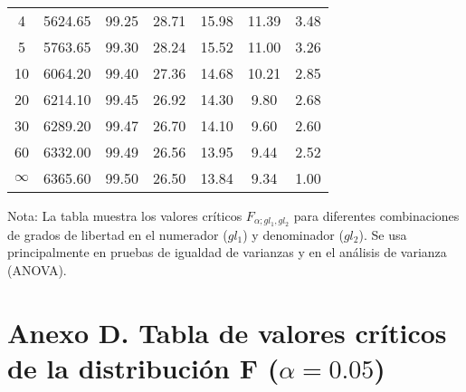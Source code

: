 {\begin{minipage}[t]{0.48\linewidth}
\begin{tabular}{c|cccccc}
4  & 5624.65 & 99.25 & 28.71 & 15.98 & 11.39 & 3.48 \\
5  & 5763.65 & 99.30 & 28.24 & 15.52 & 11.00 & 3.26 \\
10 & 6064.20 & 99.40 & 27.36 & 14.68 & 10.21 & 2.85 \\
20 & 6214.10 & 99.45 & 26.92 & 14.30 & 9.80  & 2.68 \\
30 & 6289.20 & 99.47 & 26.70 & 14.10 & 9.60  & 2.60 \\
60 & 6332.00 & 99.49 & 26.56 & 13.95 & 9.44  & 2.52 \\
$\infty$ & 6365.60 & 99.50 & 26.50 & 13.84 & 9.34  & 1.00 \\
\bottomrule
\end{tabular}
\end{minipage}
}

\medskip
\noindent\footnotesize
Nota: La tabla muestra los valores críticos $F_{\alpha;gl_1,gl_2}$ para diferentes combinaciones de grados de libertad en el numerador ($gl_1$) y denominador ($gl_2$).
Se usa principalmente en pruebas de igualdad de varianzas y en el análisis de varianza (ANOVA).
\normalsize


\section*{Anexo D. Tabla de valores críticos de la distribución F \; ($\alpha=0.05$)}

\renewcommand{\arraystretch}{1}
\setlength{\tabcolsep}{3pt} %

